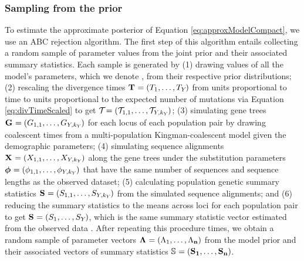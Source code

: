 \subsubsection*{Sampling from the prior}
To estimate the approximate posterior of Equation \ref{eq:approxModelCompact},
we use an ABC rejection algorithm.
The first step of this algorithm entails collecting a random sample of
parameter values from the joint prior and their associated summary
statistics.
Each sample is generated by
(1) drawing values of all the model's parameters, which we denote \hpvector{},
from their respective prior distributions;
(2) rescaling the divergence times
$\mathbf{T_{}} = (T_{1}, \ldots, T_{Y_{}})$
from units proportional to time to units proportional to the expected number
of mutations via Equation \ref{eq:divTimeScaled} to get 
$\divTimeScaledVector = (\divTimeScaled{1}{1}, \ldots,
\divTimeScaled{\npairs{}}{\nloci{\npairs{}}})$;
(3) simulating gene trees $\geneTreeVector = (\geneTree{1}{1}, \ldots, 
\geneTree{\npairs{}}{\nloci{\npairs{}}})$
for each locus of each population pair by drawing coalescent times from
a multi-population Kingman-coalescent model given the demographic parameters;
(4) simulating sequence alignments 
$\alignmentVector = (\alignment{1}{1}, \ldots, \alignment{\npairs{}}{\nloci{\npairs{}}})$
along the gene trees under the
\hky substitution parameters
$\hkyModelVector = (\hkyModel{1}{1}, \ldots, \hkyModel{\npairs{}}{\nloci{\npairs{}}})$
that have the same number of sequences and sequence lengths as the observed
dataset;
(5) calculating population genetic summary statistics
$\ssVector{} = (\alignmentSS{1}{1}, \ldots, \alignmentSS{\npairs{}}{\nloci{\npairs{}}})$
from the simulated sequence alignments;
and (6) reducing the summary statistics to the means across loci for each
population pair to get
$\ssVector{} = (\alignmentSS{1}{}, \ldots, \alignmentSS{\npairs{}}{})$, which is
the same summary statistic vector estimated from the observed data \ssVectorObs.
After repeating this procedure \numPriorSamples times, we obtain a random
sample of parameter vectors
$\boldsymbol{\Lambda_{}} = (\Lambda_{1}, \ldots, \Lambda_{\mathbf{n}})$
from the model prior and their associated vectors of summary statistics
$\ssMatrix = (\ssVector{1}, \ldots, \ssVector{\numPriorSamples})$.

